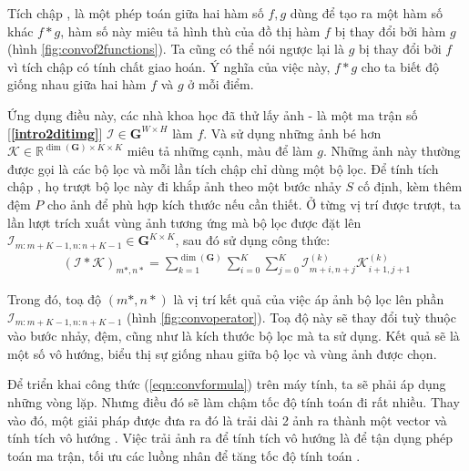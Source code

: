 \documentclass[a4paper, 12pt]{report}
\begin{document}
Tích chập \cite{wikiconv2021}, là một phép toán giữa hai hàm số $f, g$ dùng để tạo ra một hàm số khác $f \ast g$, hàm số này miêu tả hình thù của đồ thị hàm $f$ bị thay đổi bởi hàm $g$ (hình \ref{fig:convof2functions}).
Ta cũng có thể nói ngược lại là $g$ bị thay đổi bởi $f$ vì tích chập có tính chất giao hoán.
Ý nghĩa của việc này, $f \ast g$ cho ta biết độ giống nhau giữa hai hàm $f$ và $g$ ở mỗi điểm.\vspace{5pt}

Ứng dụng điều này, các nhà khoa học đã thử lấy ảnh - là một ma trận số [\textbf{\ref{intro2ditimg}}] $\mathcal{I} \in \bm{G}^{W \times H}$ làm $f$.
Và sử dụng những ảnh bé hơn $\mathcal{K} \in \mathbb{R}^{\dim\left(\bm{G}\right) \times K \times K}$ miêu tả những cạnh, màu để làm $g$.
Những ảnh này thường được gọi là các bộ lọc và mỗi lần tích chập chỉ dùng một bộ lọc.
Để tính tích chập \cite{wikikernalimgpro2021}, họ trượt bộ lọc này đi khắp ảnh theo một bước nhảy $S$ cố định, kèm thêm đệm $P$ \cite{dl2sandp2021} cho ảnh để phù hợp kích thước nếu cần thiết.
Ở từng vị trí được trượt, ta lần lượt trích xuất vùng ảnh tương ứng mà bộ lọc được đặt lên $\mathcal{I}_{m:m + K - 1, n: n + K - 1} \in \bm{G}^{K \times K}$, sau đó sử dụng công thức:
\begin{align}
    \left(\mathcal{I} \ast \mathcal{K}\right)_{m*, n*}=\sum_{k=1}^{\dim\left(\bm{G}\right)}\sum_{i=0}^K\sum_{j=0}^K\mathcal{I}^{\left(k\right)}_{m+i,n+j}\mathcal{K}^{\left(k\right)}_{i+1, j+1}\label{eqn:convformula}
\end{align}

Trong đó, toạ độ $(m*, n*)$ là vị trí kết quả của việc áp ảnh bộ lọc lên phần $\mathcal{I}_{m:m + K - 1, n: n + K - 1}$ (hình \ref{fig:convoperator}).
Toạ độ này sẽ thay đổi tuỳ thuộc vào bước nhảy, đệm, cũng như là kích thước bộ lọc mà ta sử dụng.
Kết quả sẽ là một số vô hướng, biểu thị sự giống nhau giữa bộ lọc và vùng ảnh được chọn.\vspace{5pt}

Để triển khai công thức (\ref{eqn:convformula}) trên máy tính, ta sẽ phải áp dụng những vòng lặp.
Nhưng điều đó sẽ làm chậm tốc độ tính toán đi rất nhiều.
Thay vào đó, một giải pháp được đưa ra đó là trải dài 2 ảnh ra thành một vector và tính tích vô hướng \cite{wikidotproduct2021}.
Việc trải ảnh ra để tính tích vô hướng là để tận dụng phép toán ma trận, tối ưu các luồng nhân để tăng tốc độ tính toán \cite{matrixcalfaster2018}.\vspace{5pt}
\end{document}
